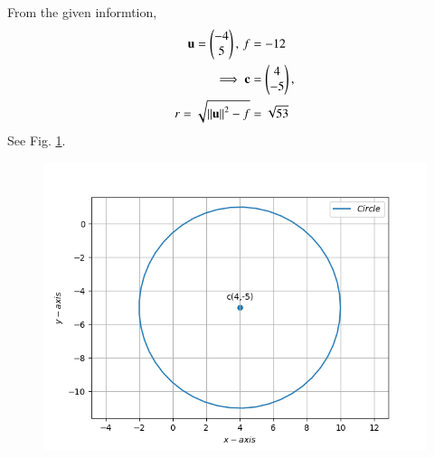 From the given informtion,
\begin{align}
 \mathbf{u}=\begin{pmatrix}-4\\5\end{pmatrix},\,
 f&=-12\\
\implies \mathbf{c}&=\begin{pmatrix}4 \\ -5\end{pmatrix},\\
	r=\sqrt{\left\lVert\mathbf{u}\right\rVert^2-f}
&=\sqrt{53}
\end{align}
See Fig. 
\ref{fig:chapters/11/11/1/8/Fig1}.
\begin{figure}[!h]
	\begin{center} 
	   \includegraphics[width=\columnwidth]{chapters/11/11/1/8/figs/11.1.8.png}
	\end{center}
\caption{}
\label{fig:chapters/11/11/1/8/Fig1}
\end{figure}
